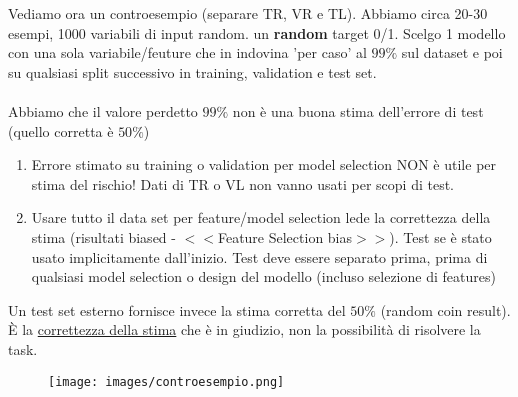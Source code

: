 \begin{example}
    Vediamo ora un controesempio (separare TR, VR e TL). Abbiamo circa 20-30 esempi, 1000 variabili di input random.
    un \textbf{random} target 0/1. Scelgo 1 modello con una sola variabile/feuture che in indovina 'per caso' al
    $99\%$ sul dataset e poi su qualsiasi split successivo in training, validation e test set.\\\\
    Abbiamo che il valore perdetto $99\%$ non è una buona stima dell'errore di test (quello corretta è $50\%$)
    \begin{enumerate}
        \item Errore stimato su training o validation per model selection NON è utile per stima del rischio! Dati di TR o VL non vanno usati per scopi di test.
        \item Usare tutto il data set per feature/model selection lede la correttezza della stima (risultati biased - $<<$Feature Selection bias$>>$). Test se è stato usato implicitamente dall'inizio.
        Test deve essere separato prima, prima di qualsiasi model selection o design del modello (incluso selezione di features)
    \end{enumerate}
    Un test set esterno fornisce invece la stima corretta del $50\%$ (random coin result). È la \underline{correttezza della stima} che è in giudizio, non la possibilità di risolvere la task.
    \begin{figure}[h!]
        \centering
        \texttt{[image: images/controesempio.png]}
    \end{figure}
\end{example}

